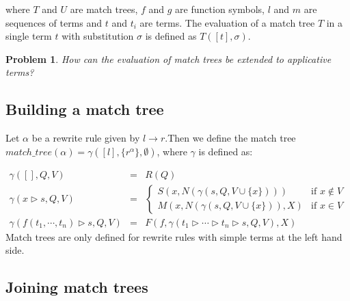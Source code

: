 \documentclass{article}
\newtheorem{problem}[theorem]{Problem}
\begin{document}
where $T$ and $U$ are match trees, $f$ and $g$ are function symbols, $l$ and 
$m$ are sequences of terms and $t$ and $t_{i}$ are terms. The evaluation of
a match tree $T$ in a single term $t$ with substitution $\sigma $ is defined
as $T([t],\sigma )$.

\begin{problem}
How can the evaluation of match trees be extended to applicative terms?
\end{problem}

\subsection{Building a match tree}

Let $\alpha $ be a rewrite rule given by $l\rightarrow r$.Then we define the
match tree $match\_tree(\alpha )=\gamma ([l],\{r^{\alpha }\},\emptyset )$,
where $\gamma $ is defined as:

\begin{equation*}
\begin{array}{lll}
\gamma ([],Q,V) & = & R(Q) \\ 
\gamma (x\rhd s,Q,V) & = & \left\{ 
\begin{array}{ll}
S(x,N(\gamma (s,Q,V\cup \{x\}))) & \text{if }x\notin V \\ 
M(x,N(\gamma (s,Q,V\cup \{x\})),X) & \text{if }x\in V%
\end{array}%
\right. \\ 
\gamma (f(t_{1},\cdots ,t_{n})\rhd s,Q,V) & = & F(f,\gamma (t_{1}\rhd \cdots
\rhd t_{n}\rhd s,Q,V),X)%
\end{array}%
\end{equation*}%
Match trees are only defined for rewrite rules with simple terms at the left
hand side.

\subsection{Joining match trees}
\end{document}
